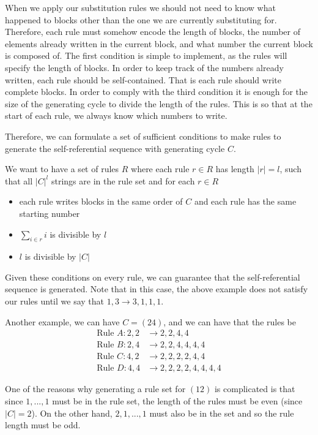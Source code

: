 \documentclass[runningheads,a4paper]{llncs}
\begin{document}
When we apply our substitution rules we should not need to know what happened to blocks other than the one we are currently substituting for. Therefore, each rule must somehow encode the length of  blocks, the number of elements already written in the current block, and what number the current block is composed of. The first condition is simple to implement, as the rules will specify the length of blocks. In order to keep track of the numbers already written, each rule should be self-contained. That is each rule should write complete blocks. In order to comply with the third condition it is enough for the size of the generating cycle to divide the length of the rules. This is so that at the start of each rule, we always know which numbers to write.

Therefore, we can formulate a set of sufficient conditions to make rules to generate the self-referential sequence with generating cycle $C$. 

We want to have a set of rules $R$ where each rule $r \in R$ has length $|r| = l$, such that all $|C|^{l}$ strings are in the rule set and for each $r \in R$
\begin{itemize}
\item each rule writes blocks in the same order of $C$ and each rule has the same starting number
\item $\sum_{i \in r} i$ is divisible by $l$
\item $l$ is divisible by $|C|$
\end{itemize}
Given these conditions on every rule, we can guarantee that the self-referential sequence is generated. Note that in this case, the above example does not satisfy our rules until we say that $1, 3 \to 3, 1, 1, 1$.

Another example, we can have $C = (2 4)$, and we can have that the rules be
\begin{align*}
\text{Rule }A: 2,2 &\to 2, 2, 4, 4 \\
\text{Rule }B: 2,4 &\to 2, 2, 4,4,4,4\\
\text{Rule }C: 4,2 &\to 2,2,2,2,4,4\\
\text{Rule }D: 4,4 &\to 2, 2, 2, 2, 4, 4, 4, 4
\end{align*}

One of the reasons why generating a rule set for $(1 2)$ is complicated is that since $1, ..., 1$ must be in the rule set, the length of the rules must be even (since $|C| = 2$). On the other hand, $2, 1, ..., 1$ must also be in the set and so the rule length must be odd. 
\end{document}
